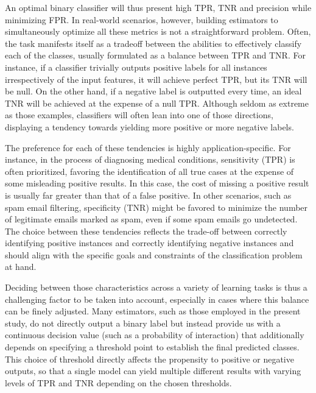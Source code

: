 An optimal binary classifier will thus present high TPR, TNR and precision while minimizing FPR.
In real-world scenarios, however, building estimators to simultaneously optimize all these metrics is not a straightforward problem. Often, the task manifests itself as a tradeoff between the abilities to effectively classify each of the classes, usually formulated as a balance between TPR and TNR. For instance, if a classifier trivially outputs positive labels for all instances irrespectively of the input features, it will achieve perfect TPR, but its TNR will be null. On the other hand, if a negative label is outputted every time, an ideal TNR will be achieved at the expense of a null TPR. Although seldom as extreme as those examples, classifiers will often lean into one of those directions, displaying a tendency towards yielding more positive
or more negative
labels.

The preference for each of these tendencies is highly application-specific. For instance, in the process of diagnosing medical conditions, sensitivity (TPR) is often prioritized, favoring the identification of all true cases at the expense of some misleading positive results.
In this case, the cost of missing a positive result is usually far greater than that of a false positive. In other scenarios, such as spam email filtering, specificity (TNR) might be favored to minimize the number of legitimate emails marked as spam, even if some spam emails go undetected. The choice between these tendencies reflects the trade-off between correctly identifying positive instances and correctly identifying negative instances and should align with the specific goals and constraints of the classification problem at hand.

Deciding between those characteristics across a variety of learning tasks
is thus a challenging factor to be taken into account, especially in cases where this balance can be finely adjusted.
%
Many estimators, such as those employed in the present study, do not directly output a binary label but instead provide us with a continuous decision value (such as a probability of interaction) that additionally depends on specifying a threshold point to establish the final predicted classes. This choice of threshold directly affects the propensity to positive or negative outputs, so that a single model can yield multiple different results with varying levels of TPR and TNR depending on the chosen thresholds.

